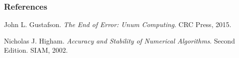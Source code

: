 \begin{frame}

\frametitle{References}

\footnotesize

\begin{thebibliography}{9}

 John L. Gustafson. \emph{The End of
Error: Unum Computing}. CRC Press, 2015.

 Nicholas J. Higham. \emph{Accuracy and
Stability of Numerical Algorithms}. Second Edition. SIAM, 2002.

\end{thebibliography}

\end{frame}
